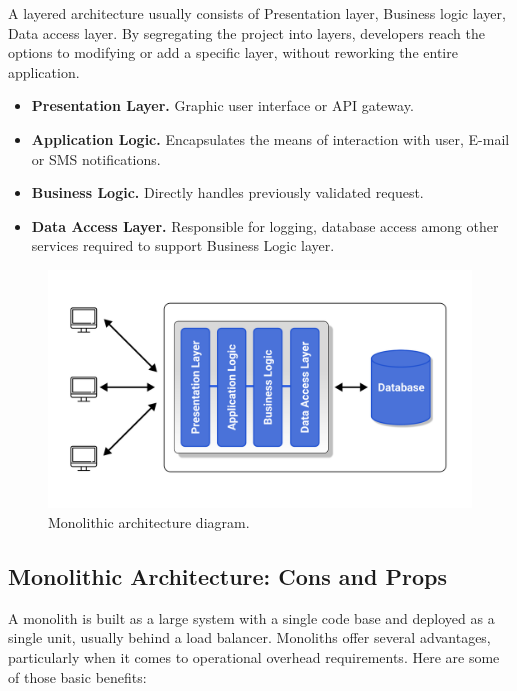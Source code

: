A layered architecture usually consists of Presentation layer, Business logic layer, Data access layer.
By segregating the project into layers, developers reach the options to modifying or add a specific layer,
without reworking the entire application.

\begin{itemize}
    \item \textbf{Presentation Layer.} Graphic user interface or API gateway.
    \item \textbf{Application Logic.} Encapsulates the means of interaction with user, E-mail or SMS notifications.
    \item \textbf{Business Logic.} Directly handles previously validated request.
    \item \textbf{Data Access Layer.} Responsible for logging, database access among other services required to support
    Business Logic layer.
\end{itemize}

\begin{figure}[H]
    \centering
    \includegraphics[width=1\textwidth]{Pictures/Monolith_architecture.pdf}
    \caption{Monolithic architecture diagram.}\label{fig:figure2}
\end{figure}

\subsection{Monolithic Architecture: Cons and Props}\label{subsec:monolith-architecture:-cons-and-props}

A monolith is built as a large system with a single code base and deployed as a single unit, usually behind a load balancer.
Monoliths offer several advantages, particularly when it comes to operational overhead requirements.
Here are some of those basic benefits:

